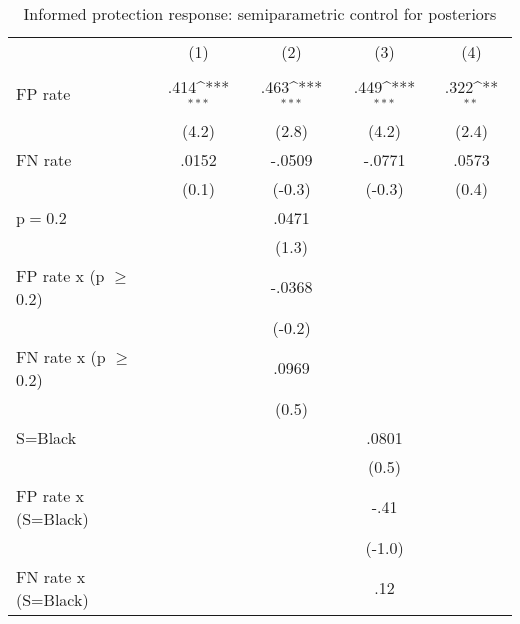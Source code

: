 \begin{table}[htbp]\centering
\def\sym#1{\ifmmode^{#1}\else\(^{#1}\)\fi}
\caption{Informed protection response: semiparametric control for posteriors}
\begin{tabular}{l*{4}{c}}
\hline\hline
                &\multicolumn{1}{c}{(1)}&\multicolumn{1}{c}{(2)}&\multicolumn{1}{c}{(3)}&\multicolumn{1}{c}{(4)}\\
                &\multicolumn{1}{c}{}&\multicolumn{1}{c}{}&\multicolumn{1}{c}{}&\multicolumn{1}{c}{}\\
\hline
FP rate         &     .414\sym{***}&     .463\sym{***}&     .449\sym{***}&     .322\sym{**} \\
                &    (4.2)         &    (2.8)         &    (4.2)         &    (2.4)         \\
FN rate         &    .0152         &   -.0509         &   -.0771         &    .0573         \\
                &    (0.1)         &   (-0.3)         &   (-0.3)         &    (0.4)         \\
p$=$0.2         &                  &    .0471         &                  &                  \\
                &                  &    (1.3)         &                  &                  \\
FP rate x (p $\geq$ 0.2)&                  &   -.0368         &                  &                  \\
                &                  &   (-0.2)         &                  &                  \\
FN rate x (p $\geq$ 0.2)&                  &    .0969         &                  &                  \\
                &                  &    (0.5)         &                  &                  \\
S=Black         &                  &                  &    .0801         &                  \\
                &                  &                  &    (0.5)         &                  \\
FP rate x (S=Black)&                  &                  &     -.41         &                  \\
                &                  &                  &   (-1.0)         &                  \\
FN rate x (S=Black)&                  &                  &      .12         &                  \\

\end{tabular}
\end{table}
